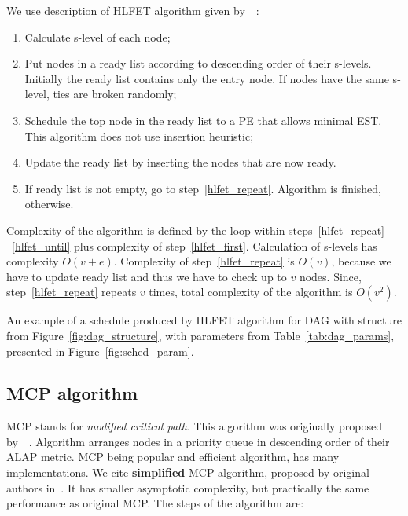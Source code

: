 We use description of HLFET algorithm given
by~\citeauthor{kwok1999static}~\cite{kwok1999static}:

\begin{enumerate}
\item \label{hlfet_first} Calculate s-level of each node;
\item \label{hlfet_repeat} Put nodes in a ready list according to descending order of their
  s-levels. Initially the ready list contains only the entry node. If
  nodes have the same s-level, ties are broken randomly;
\item Schedule the top node in the ready list to a PE that allows
  minimal EST. This algorithm does not use insertion heuristic;
\item Update the ready list by inserting the nodes that are now ready.
\item \label{hlfet_until} If ready list is not empty, go to
  step~\ref{hlfet_repeat}. Algorithm is finished, otherwise.
\end{enumerate}

Complexity of the algorithm is defined by the loop within
steps~\ref{hlfet_repeat}-~\ref{hlfet_until} plus complexity of
step~\ref{hlfet_first}. Calculation of s-levels has complexity
$O(v + e)$. Complexity of
step~\ref{hlfet_repeat} is $O(v)$, because we have to update ready
list and thus we have to check up to $v$ nodes. Since,
step~\ref{hlfet_repeat} repeats $v$ times, total complexity of the
algorithm is $O(v^2)$.

An example of a schedule produced by HLFET algorithm for DAG with
structure from Figure~\ref{fig:dag_structure}, with parameters from
Table~\ref{tab:dag_params}, presented in Figure~\ref{fig:sched_param}.

\subsection{MCP algorithm}
\label{sec:MCP}

MCP stands for \emph{modified critical path}. This algorithm was
originally proposed
by~\citeauthor{wu1990hypertool}~\cite{wu1990hypertool}. Algorithm
arranges nodes in a priority queue in descending order of their ALAP
metric. MCP being popular and efficient algorithm, has many
implementations. We cite \textbf{simplified} MCP algorithm, proposed by
original authors in~\cite{wu2000mcp}. It has smaller asymptotic
complexity, but practically the same performance as original MCP. The
steps of the algorithm are:

